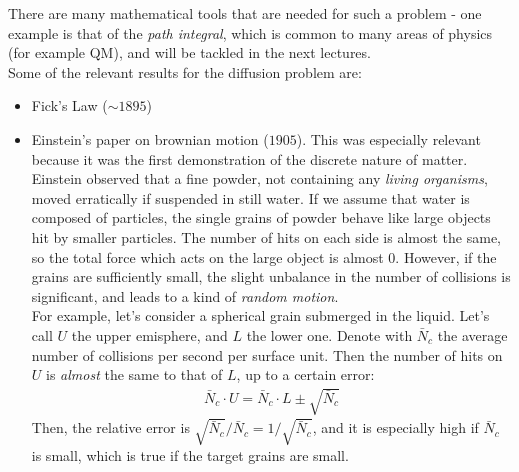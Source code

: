 \documentclass[../template.tex]{subfiles}
\begin{document}
There are many mathematical tools that are needed for such a problem - one example is that of the \textit{path integral}, which is common to many areas of physics (for example QM), and will be tackled in the next lectures.\\

Some of the relevant results for the diffusion problem are:
\begin{itemize}
\item Fick's Law ($\sim 1895$)
\item Einstein's paper on brownian motion ($1905$). This was especially relevant because it was the first demonstration of the discrete nature of matter. Einstein observed that a fine powder, not containing any \textit{living organisms}, moved erratically if suspended in still water. If we assume that water is composed of particles, the single grains of powder behave like large objects hit by smaller particles. The number of hits on each side is almost the same, so the total force which acts on the large object is almost $0$. However, if the grains are sufficiently small, the slight unbalance in the number of collisions is significant, and leads to a kind of \textit{random motion}.\\

For example, let's consider a spherical grain submerged in the liquid. Let's call $U$ the upper emisphere, and $L$ the lower one. Denote with $\bar{N}_c$ the average number of collisions per second per surface unit. Then the number of hits on $U$ is \textit{almost} the same to that of $L$, up to a certain error:
\begin{align*}
\bar{N}_c \cdot U = \bar{N}_c \cdot L \pm \sqrt{\bar{N}_c}
\end{align*}
Then, the relative error is $\sqrt{\bar{N}_c}/\bar{N}_c = 1/\sqrt{\bar{N}_c}$, and it is especially high if $\bar{N}_c$ is small, which is true if the target grains are small.
\end{itemize}
\end{document}
